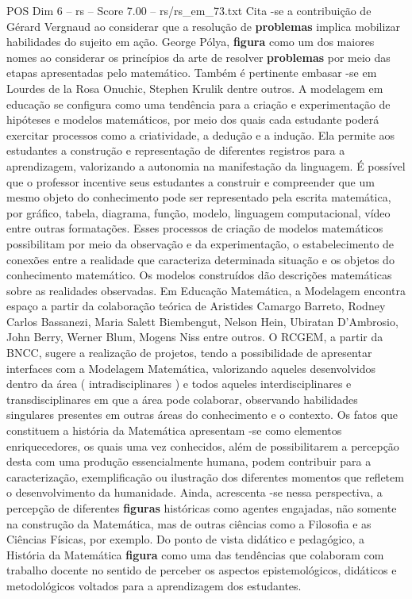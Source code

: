 \begin{textsample}{POS Dim 6 – rs – Score 7.00 – rs/rs\_em\_73.txt}
Cita -se a contribuição de Gérard Vergnaud ao considerar que a resolução de \textbf{problemas} implica mobilizar habilidades do sujeito em ação.
George Pólya, \textbf{figura} como um dos maiores nomes ao considerar os princípios da arte de resolver \textbf{problemas} por meio das etapas apresentadas pelo matemático.
Também é pertinente embasar -se em Lourdes de la Rosa Onuchic, Stephen Krulik dentre outros.
A modelagem em educação se configura como uma tendência para a criação e experimentação de hipóteses e modelos matemáticos, por meio dos quais cada estudante poderá exercitar processos como a criatividade, a dedução e a indução.
Ela permite aos estudantes a construção e representação de diferentes registros para a aprendizagem, valorizando a autonomia na manifestação da linguagem.
É possível que o professor incentive seus estudantes a construir e compreender que um mesmo objeto do conhecimento pode ser representado pela escrita matemática, por gráfico, tabela, diagrama, função, modelo, linguagem computacional, vídeo entre outras formatações.
Esses processos de criação de modelos matemáticos possibilitam por meio da observação e da experimentação, o estabelecimento de conexões entre a realidade que caracteriza determinada situação e os objetos do conhecimento matemático.
Os modelos construídos dão descrições matemáticas sobre as realidades observadas.
Em Educação Matemática, a Modelagem encontra espaço a partir da colaboração teórica de Aristides Camargo Barreto, Rodney Carlos Bassanezi, Maria Salett Biembengut, Nelson Hein, Ubiratan D’Ambrosio, John Berry, Werner Blum, Mogens Niss entre outros.
O RCGEM, a partir da BNCC, sugere a realização de projetos, tendo a possibilidade de apresentar interfaces com a Modelagem Matemática, valorizando aqueles desenvolvidos dentro da área ( intradisciplinares ) e todos aqueles interdisciplinares e transdisciplinares em que a área pode colaborar, observando habilidades singulares presentes em outras áreas do conhecimento e o contexto.
Os fatos que constituem a história da Matemática apresentam -se como elementos enriquecedores, os quais uma vez conhecidos, além de possibilitarem a percepção desta com uma produção essencialmente humana, podem contribuir para a caracterização, exemplificação ou ilustração dos diferentes momentos que refletem o desenvolvimento da humanidade.
Ainda, acrescenta -se nessa perspectiva, a percepção de diferentes \textbf{figuras} históricas como agentes engajadas, não somente na construção da Matemática, mas de outras ciências como a Filosofia e as Ciências Físicas, por exemplo.
Do ponto de vista didático e pedagógico, a História da Matemática \textbf{figura} como uma das tendências que colaboram com trabalho docente no sentido de perceber os aspectos epistemológicos, didáticos e metodológicos voltados para a aprendizagem dos estudantes.

\end{textsample}
